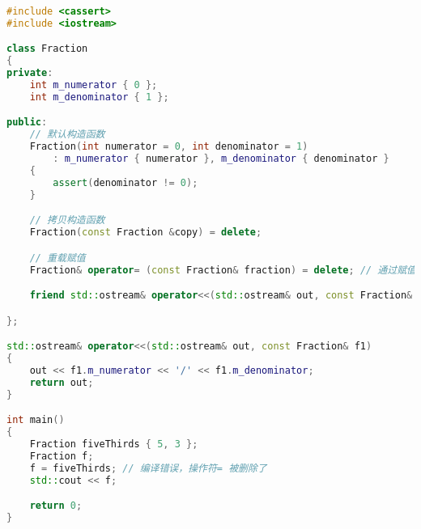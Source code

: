 \documentclass[../../LearnCpp.tex]{subfiles}
\begin{document}
\begin{lstlisting}[language=C++]
#include <cassert>
#include <iostream>

class Fraction
{
private:
	int m_numerator { 0 };
	int m_denominator { 1 };

public:
    // 默认构造函数
    Fraction(int numerator = 0, int denominator = 1)
        : m_numerator { numerator }, m_denominator { denominator }
    {
        assert(denominator != 0);
    }

	// 拷贝构造函数
	Fraction(const Fraction &copy) = delete;

	// 重载赋值
	Fraction& operator= (const Fraction& fraction) = delete; // 通过赋值没有拷贝！

	friend std::ostream& operator<<(std::ostream& out, const Fraction& f1);

};

std::ostream& operator<<(std::ostream& out, const Fraction& f1)
{
	out << f1.m_numerator << '/' << f1.m_denominator;
	return out;
}

int main()
{
    Fraction fiveThirds { 5, 3 };
    Fraction f;
    f = fiveThirds; // 编译错误，操作符= 被删除了
    std::cout << f;

    return 0;
}
\end{lstlisting}
\end{document}
